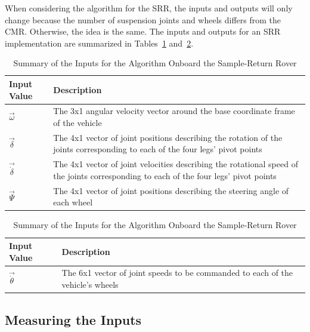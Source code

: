 When considering the algorithm for the \ac{SRR}, the inputs and outputs will only change because the number of suspension joints and wheels differs from the \ac{CMR}. Otherwise, the idea is the same. The inputs and outputs for an \ac{SRR} implementation are summarized in Tables~\ref{traction_control:discussion:inputs-srr} and~\ref{traction_control:discussion:outputs-srr}.

\begin{table}[H]
	\centering
	\begin{tabular}{| >{\centering\arraybackslash} m{1.2in} | >{\centering\arraybackslash} m{4.5in} |}
		\hline
		\textbf{Input Value} & \textbf{Description} \\
		\hline
		$\vec{\omega}$ & The 3x1 angular velocity vector around the base coordinate frame of the vehicle \\
		\hline
		$\vec{\delta}$ & The 4x1 vector of joint positions describing the rotation of the joints corresponding to each of the four legs' pivot points \\
		\hline
		$\vec{\dot{\delta}}$ & The 4x1 vector of joint velocities describing the rotational speed of the joints corresponding to each of the four legs' pivot points \\
		\hline
		$\vec{\Psi}$ & The 4x1 vector of joint positions describing the steering angle of each wheel \\
		\hline
	\end{tabular}
	\caption{Summary of the Inputs for the Algorithm Onboard the Sample-Return Rover}
	\label{traction_control:discussion:inputs-srr}
\end{table}

\begin{table}[H]
	\centering
	\begin{tabular}{| >{\centering\arraybackslash} m{1.2in} | >{\centering\arraybackslash} m{4.5in} |}
		\hline
		\textbf{Input Value} & \textbf{Description} \\
		\hline
		$\vec{\dot{\theta}}$ & The 6x1 vector of joint speeds to be commanded to each of the vehicle's wheels \\
		\hline
	\end{tabular}
	\caption{Summary of the Inputs for the Algorithm Onboard the Sample-Return Rover}
	\label{traction_control:discussion:outputs-srr}
\end{table}

\subsection{Measuring the Inputs}

